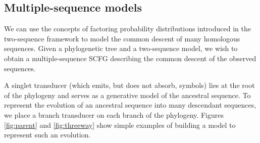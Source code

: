 \documentclass[10pt]{article}
\begin{document}


\subsection*{Multiple-sequence models}

We can use the concepts of factoring probability distributions introduced in the two-sequence
framework to model the common descent of many homologous sequences.
Given a phylogenetic tree and a two-sequence model, we wish to obtain a
multiple-sequence SCFG describing the common descent of the observed sequences.



A singlet transducer (which emits, but does not absorb, symbols) lies at the root of the phylogeny and 
serves as a generative model of the ancestral sequence.
To represent the evolution of an ancestral sequence into many descendant sequences,
we place a branch transducer on each branch of the phylogeny.
Figures \ref{fig:parent} and \ref{fig:threeway} show simple examples
of building a model to represent such an evolution.
\end{document}
